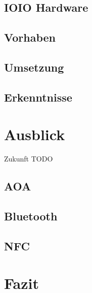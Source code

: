 \documentclass[12pt,journal,compsoc]{IEEEtran}
\begin{document}
\subsection{IOIO Hardware}

\subsection{Vorhaben}

\subsection{Umsetzung}

\subsection{Erkenntnisse}





\section{Ausblick}
Zukunft TODO
\subsection{AOA}

\subsection{Bluetooth}

\subsection{NFC}
\section{Fazit}









\nocite{*}
\end{document}
